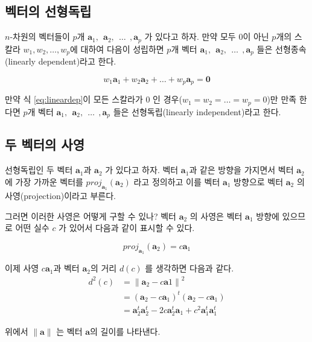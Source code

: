\documentclass[
]{book}
\newcommand{\norm}[1]{\left\lVert#1\right\rVert}
\theoremstyle{definition}
\theoremstyle{definition}
\theoremstyle{definition}
\theoremstyle{remark}
\begin{document}
\hypertarget{uxbca1uxd130uxc758-uxc120uxd615uxb3c5uxb9bd}{%
\subsection{벡터의 선형독립}\label{uxbca1uxd130uxc758-uxc120uxd615uxb3c5uxb9bd}}

\(n\)-차원의 벡터들이 \(p\)개 \(\bm a_1, ~~ \bm a_2, ~~\dots ~~, \bm a_p\) 가 있다고 하자.
만약 모두 \(0\)이 아닌 \(p\)개의 스칼라 \(w_1,w_2,\dots,w_p\)에 대하여 다음이 성립하면 \(p\)개 벡터 \(\bm a_1, ~~ \bm a_2, ~~\dots ~~, \bm a_p\) 들은 선형종속(linearly dependent)라고 한다.

\begin{equation}
w_1 \bm a_1 + w_2 \bm a_2 + \dots + w_p \bm a_p = \bm 0 
\label{eq:lineardep}
\end{equation}

만약 식 \eqref{eq:lineardep}이 모든 스칼라가 0 인 경우(\(w_1=w_2=\dots=w_p=0\))만 만족 한다면 \(p\)개 벡터 \(\bm a_1, ~~ \bm a_2, ~~\dots ~~, \bm a_p\) 들은 선형독립(linearly independent)라고 한다.

\hypertarget{uxb450-uxbca1uxd130uxc758-uxc0acuxc601}{%
\subsection{두 벡터의 사영}\label{uxb450-uxbca1uxd130uxc758-uxc0acuxc601}}

선형독립인 두 벡터 \(\bm a_1\)과 \(\bm a_2\) 가 있다고 하자. 벡터 \(\bm a_1\)과 같은 방향을 가지면서 벡터 \(\bm a_2\)에 가장 가까운 벡터를 \(proj_{\bm a_1} (\bm a_2)\) 라고 정의하고 이를 벡터 \(\bm a_1\) 방향으로 벡터 \(\bm a_2\) 의 사영(projection)이라고 부른다.

그러면 이러한 사영은 어떻게 구할 수 있나? 벡터 \(\bm a_2\) 의 사영은 벡터 \(\bm a_1\) 방향에 있으므로 어떤 실수 \(c\) 가 있어서 다음과 같이 표시할 수 있다.

\[ proj_{\bm a_1} (\bm a_2) =  c \bm a_1 \]

이제 사영 \(c \bm a_1\)과 벡터 \(\bm a_2\)의 거리 \(d(c)\) 를 생각하면 다음과 같다.
\begin{align*}
d^2(c) & = \norm{\bm a_2 - c \bm a1}^2 \\
   & = (\bm a_2 - c \bm a_1)^t(\bm a_2 - c \bm a_1) \\
   & = \bm a^t_2 \bm a^t_2 -2 c \bm a_2^t \bm a_1 + c^2 \bm a^t_1 \bm a^t_1
\end{align*}

위에서 \(\norm{\bm a}\) 는 벡터 \(\bm a\)의 길이를 나타낸다.
\end{document}
